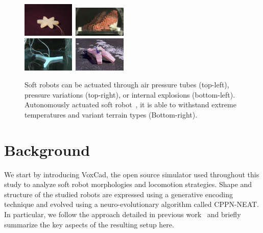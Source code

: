 \documentclass{sig-alternate}
\begin{document}
\begin{figure}[t!]
\centering
\includegraphics[width=0.22\textwidth,height=0.12\textheight]{../Figures/Misc/soft_robotics_figure.png}\		
\includegraphics[width=0.22\textwidth,height=0.12\textheight]{../Figures/Misc/hillerPressureChamber.png}\\[0.1cm]	
\includegraphics[width=0.22\textwidth,height=0.12\textheight]{../Figures/Misc/ExplodingRobot.jpg}\	
\includegraphics[width=0.22\textwidth,height=0.12\textheight]{../Figures/Misc/softbot.jpg}\\
\caption{Soft robots can be actuated through air pressure tubes (top-left), pressure variations (top-right), or internal explosions (bottom-left). Autonomously actuated soft robot~\cite{tolley2014resilient}, it is able to withstand extreme temperatures and variant terrain types (Bottom-right).}
\label{fig:softRobotsActuation}
\end{figure}


\section{Background}
We start by introducing VoxCad, the open source simulator used throughout this study to analyze soft robot morphologies and locomotion strategies. Shape and structure of the studied robots are expressed using a generative encoding technique and evolved using a neuro-evolutionary algorithm called CPPN-NEAT. In particular, we follow the approach detailed in previous work~\cite{cheney2013unshackling} and briefly summarize the key aspects of the resulting setup here.
\end{document}
